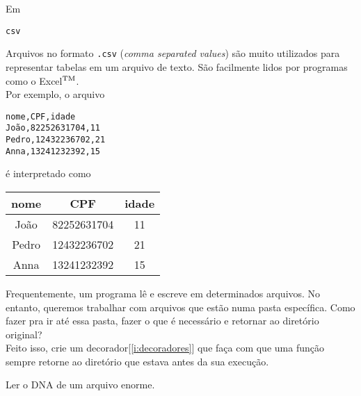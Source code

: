 	\quest Em
	
	
	
	\begin{interlude}{\texttt{csv}}
	
	Arquivos no formato \texttt{.csv} (\textit{comma separated values}) são muito utilizados para representar tabelas em um arquivo de texto. São facilmente lidos por programas como o Excel$^{\tiny \text{TM}}$.\\
	
	Por exemplo, o arquivo
	
	\begin{lstlisting}
nome,CPF,idade
João,82252631704,11
Pedro,12432236702,21
Anna,13241232392,15
	\end{lstlisting}
	
	é interpretado como
	
	\begin{center}
	\begin{tabular}{|c|c|c|}
	\hline
	nome  & CPF         & idade\\
	\hline 
	João  & 82252631704 &11\\
	\hline
	Pedro & 12432236702 &21\\
	\hline
	Anna  & 13241232392 &15\\
	\hline
	\end{tabular}
	\end{center}
	
	\end{interlude}
	
	
	Frequentemente, um programa lê e escreve em determinados arquivos. No entanto, queremos trabalhar com arquivos que estão numa pasta específica. Como fazer pra ir até essa pasta, fazer o que é necessário e retornar ao diretório original?\\
	
	\quest Feito isso, crie um decorador[\ref{i:decoradores}] que faça com que uma função sempre retorne ao diretório que estava antes da sua execução.
	
	\label{p:dna2}
	
	Ler o DNA de um arquivo enorme.